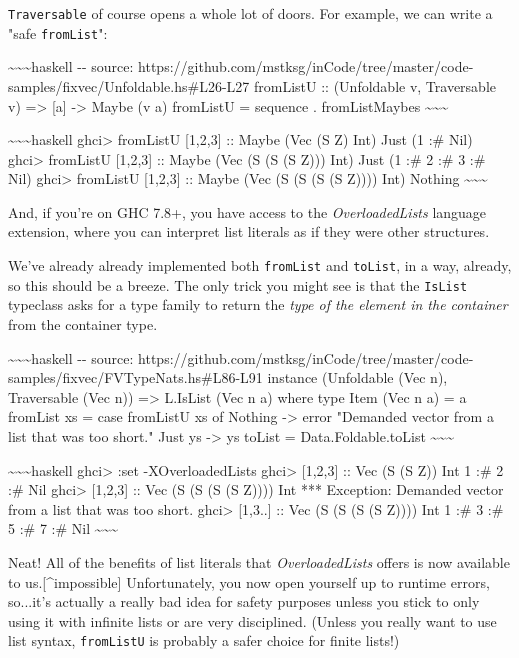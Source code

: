 \documentclass[]{article}
\begin{document}
\texttt{Traversable} of course opens a whole lot of doors. For example, we can
write a "safe \texttt{fromList}":

\textasciitilde{}\textasciitilde{}\textasciitilde{}haskell -\/- source:
https://github.com/mstksg/inCode/tree/master/code-samples/fixvec/Unfoldable.hs\#L26-L27
fromListU :: (Unfoldable v, Traversable v) =\textgreater{} {[}a{]}
-\textgreater{} Maybe (v a) fromListU = sequence . fromListMaybes
\textasciitilde{}\textasciitilde{}\textasciitilde{}

\textasciitilde{}\textasciitilde{}\textasciitilde{}haskell ghci\textgreater{}
fromListU {[}1,2,3{]} :: Maybe (Vec (S Z) Int) Just (1 :\# Nil)
ghci\textgreater{} fromListU {[}1,2,3{]} :: Maybe (Vec (S (S (S Z))) Int) Just
(1 :\# 2 :\# 3 :\# Nil) ghci\textgreater{} fromListU {[}1,2,3{]} :: Maybe (Vec
(S (S (S (S Z)))) Int) Nothing
\textasciitilde{}\textasciitilde{}\textasciitilde{}

And, if you're on GHC 7.8+, you have access to the \emph{OverloadedLists}
language extension, where you can interpret list literals as if they were other
structures.

We've already already implemented both \texttt{fromList} and \texttt{toList}, in
a way, already, so this should be a breeze. The only trick you might see is that
the \texttt{IsList} typeclass asks for a type family to return the \emph{type of
the element in the container} from the container type.

\textasciitilde{}\textasciitilde{}\textasciitilde{}haskell -\/- source:
https://github.com/mstksg/inCode/tree/master/code-samples/fixvec/FVTypeNats.hs\#L86-L91
instance (Unfoldable (Vec n), Traversable (Vec n)) =\textgreater{} L.IsList (Vec
n a) where type Item (Vec n a) = a fromList xs = case fromListU xs of Nothing
-\textgreater{} error "Demanded vector from a list that was too short." Just ys
-\textgreater{} ys toList = Data.Foldable.toList
\textasciitilde{}\textasciitilde{}\textasciitilde{}

\textasciitilde{}\textasciitilde{}\textasciitilde{}haskell ghci\textgreater{}
:set -XOverloadedLists ghci\textgreater{} {[}1,2,3{]} :: Vec (S (S Z)) Int 1 :\#
2 :\# Nil ghci\textgreater{} {[}1,2,3{]} :: Vec (S (S (S (S Z)))) Int ***
Exception: Demanded vector from a list that was too short. ghci\textgreater{}
{[}1,3..{]} :: Vec (S (S (S (S Z)))) Int 1 :\# 3 :\# 5 :\# 7 :\# Nil
\textasciitilde{}\textasciitilde{}\textasciitilde{}

Neat! All of the benefits of list literals that \emph{OverloadedLists} offers is
now available to us.{[}\^{}impossible{]} Unfortunately, you now open yourself up
to runtime errors, so...it's actually a really bad idea for safety purposes
unless you stick to only using it with infinite lists or are very disciplined.
(Unless you really want to use list syntax, \texttt{fromListU} is probably a
safer choice for finite lists!)
\end{document}
